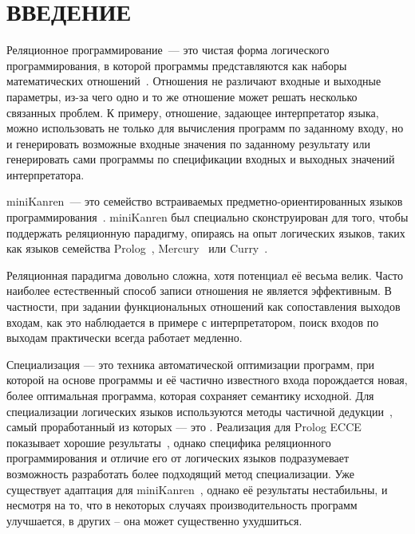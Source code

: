 \section*{ВВЕДЕНИЕ}


Реляционное программирование~--- это чистая форма логического программирования,
в которой программы представляются как наборы математических отношений~\cite{byrdMK}.
Отношения
не различают входные и выходные параметры, из-за чего одно и то же
отношение может решать несколько связанных проблем. К примеру, отношение, задающее
интерпретатор языка, можно использовать не только для вычисления программ по
заданному входу, но и генерировать возможные входные значения по заданному результату
или генерировать сами программы по спецификации входных и выходных значений интерпретатора.

miniKanren~--- это семейство встраиваемых предметно-ориентированных языков программирования~\cite{byrdMK}.
miniKanren был специально сконструирован для того, чтобы поддержать реляционную парадигму,
опираясь на опыт логических языков, таких как языков семейства Prolog~\cite{logicMJ},
Mercury~\cite{mercury} или Curry~\cite{curry}.

Реляционная парадигма довольно сложна, хотя потенциал её весьма велик.
Часто наиболее естественный способ записи отношения не является эффективным. В
частности, при задании функциональных отношений как сопоставления выходов
входам, как это наблюдается в примере с интерпретатором, поиск входов по выходам практически
всегда работает медленно.

Специализация --- это техника автоматической оптимизации программ,
при которой на основе программы и её частично известного входа
порождается новая, более оптимальная программа, которая сохраняет семантику
исходной. Для специализации логических языков используются методы частичной дедукции~\cite{advanced},
самый проработанный из которых --- это \cpd\cite{cpd}. Реализация \forcpd для Prolog ECCE показывает
хорошие результаты~\cite{controlPoly}, однако специфика реляционного программирования
и отличие его от логических языков подразумевает возможность разработать более подходящий
метод специализации. Уже существует адаптация \forcpd для miniKanren~\cite{lozov},
однако её результаты нестабильны, и несмотря на то, что в некоторых случаях
производительность программ улучшается, в других -- она может существенно ухудшиться.

